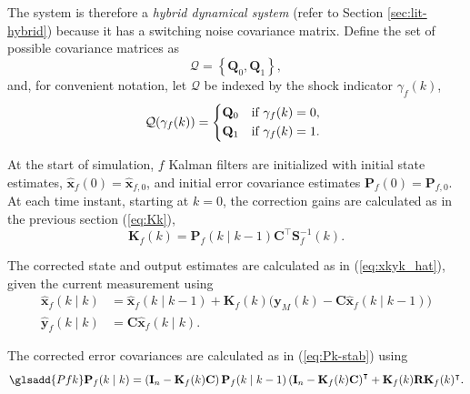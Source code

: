The system is therefore a \textit{hybrid dynamical system} (refer to Section \ref{sec:lit-hybrid}) because it has a switching noise covariance matrix. Define the set of possible covariance matrices as
\begin{equation} \label{eq:init_Q_R}
	\mathcal{Q} = \left\{\mathbf{Q}_0, \mathbf{Q}_1\right\},
\end{equation}
and, for convenient notation, let $\mathcal{Q}$ be indexed by the shock indicator $\gamma_f(k)$,
\begin{equation} \label{eq:init_Q}
	\mathcal{Q}(\gamma_f(k)) = 
	\begin{cases*}
		\mathbf{Q}_0 & \text{if} $\gamma_f(k)=0$, \\
		\mathbf{Q}_1 & \text{if} $\gamma_f(k)=1$.
	\end{cases*}
\end{equation}

At the start of simulation, $f$ Kalman filters are initialized with initial state estimates, $\mathbf{\hat{x}}_f(0) = \mathbf{\hat{x}}_{f,0}$, and initial error covariance estimates $	\mathbf{P}_f(0) = \mathbf{P}_{f,0}$. At each time instant, starting at $k=0$, the correction gains are calculated as in the previous section (\ref{eq:Kk}),
%
\begin{equation} \label{eq:Kfk}
	\mathbf{K}_f(k) = \mathbf{P}_f(k \mid k-1)\mathbf{C}^\intercal \mathbf{S}_f^{-1}(k).
\end{equation}

The corrected state and output estimates are calculated as in (\ref{eq:xkyk_hat}), given the current measurement using
%
%
\begin{equation} \label{eq:xfkyfk_hat}
	\begin{aligned}
		\mathbf{\hat{x}}_f(k \mid k) &= \mathbf{\hat{x}}_f(k \mid k-1) + \mathbf{K}_f(k) \big( \mathbf{y}_M(k) - \mathbf{C} \mathbf{\hat{x}}_f(k \mid k-1) \big) \\
		\mathbf{\hat{y}}_f(k \mid k) &= \mathbf{C} \mathbf{\hat{x}}_f(k \mid k).
	\end{aligned}
\end{equation}

The corrected error covariances are calculated as in (\ref{eq:Pk-stab}) using 
\begin{equation} \label{eq:Pkf-stab} \glsadd{Pfk}
	\mathbf{P}_f(k \mid k) = \left( \mathbf{I}_n - \mathbf{K}_f(k) \mathbf{C} \right ) \mathbf{P}_f(k \mid k-1) \left( \mathbf{I}_n - \mathbf{K}_f(k) \mathbf{C} \right )^\intercal + \mathbf{K}_f(k) \mathbf{R} \mathbf{K}_f(k)^\intercal.
\end{equation}

